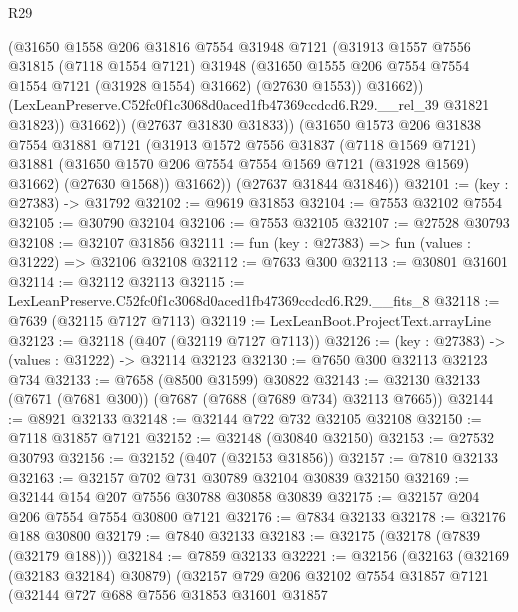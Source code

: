 \begin{lexlean}{R29}
\begin{coremodule}
                  (@31650
                    @1558
                    @206
                    @31816
                    @7554
                    @31948
                    @7121
                    (@31913
                      @1557
                      @7556
                      @31815
                      (@7118 @1554 @7121)
                      @31948
                      (@31650 @1555 @206 @7554 @7554 @1554 @7121 (@31928 @1554) @31662)
                      (@27630 @1553))
                    @31662))
                (LexLeanPreserve.C52fc0f1c3068d0aced1fb47369ccdcd6.R29.__rel_39 @31821 @31823))
              @31662))
          (@27637 @31830 @31833))
        (@31650
          @1573
          @206
          @31838
          @7554
          @31881
          @7121
          (@31913
            @1572
            @7556
            @31837
            (@7118 @1569 @7121)
            @31881
            (@31650 @1570 @206 @7554 @7554 @1569 @7121 (@31928 @1569) @31662)
            (@27630 @1568))
          @31662))
      (@27637 @31844 @31846))
@32101 := (key : @27383) -> @31792
@32102 := @9619 @31853
@32104 := @7553 @32102 @7554
@32105 := @30790 @32104
@32106 := @7553 @32105
@32107 := @27528 @30793
@32108 := @32107 @31856
@32111 := fun (key : @27383) => fun (values : @31222) => @32106 @32108
@32112 := @7633 @300
@32113 := @30801 @31601
@32114 := @32112 @32113
@32115 := LexLeanPreserve.C52fc0f1c3068d0aced1fb47369ccdcd6.R29.__fits_8
@32118 := @7639 (@32115 @7127 @7113)
@32119 := LexLeanBoot.ProjectText.arrayLine
@32123 := @32118 (@407 (@32119 @7127 @7113))
@32126 := (key : @27383) -> (values : @31222) -> @32114 @32123
@32130 := @7650 @300 @32113 @32123 @734
@32133 := @7658 (@8500 @31599) @30822
@32143 := @32130 @32133 (@7671 (@7681 @300)) (@7687 (@7688 (@7689 @734) @32113 @7665))
@32144 := @8921 @32133
@32148 := @32144 @722 @732 @32105 @32108
@32150 := @7118 @31857 @7121
@32152 := @32148 (@30840 @32150)
@32153 := @27532 @30793
@32156 := @32152 (@407 (@32153 @31856))
@32157 := @7810 @32133
@32163 := @32157 @702 @731 @30789 @32104 @30839 @32150
@32169 := @32144 @154 @207 @7556 @30788 @30858 @30839
@32175 := @32157 @204 @206 @7554 @7554 @30800 @7121
@32176 := @7834 @32133
@32178 := @32176 @188 @30800
@32179 := @7840 @32133
@32183 := @32175 (@32178 (@7839 (@32179 @188)))
@32184 := @7859 @32133
@32221 := @32156
    (@32163
      (@32169 (@32183 @32184) @30879)
      (@32157
        @729
        @206
        @32102
        @7554
        @31857
        @7121
        (@32144
          @727
          @688
          @7556
          @31853
          @31601
          @31857

\end{coremodule}
\end{lexlean}
